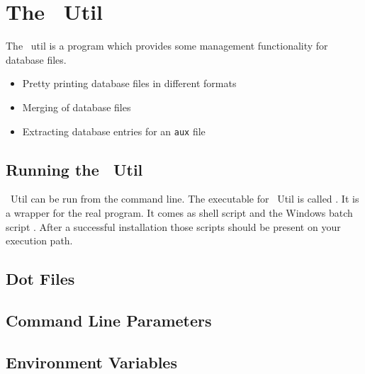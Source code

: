 

\section{The \ExBib\ Util}

The \ExBib\ util is a program which provides some management
functionality for database files. 

\begin{itemize}
\item Pretty printing database files in different formats
\item Merging of database files
\item Extracting database entries for an \texttt{aux} file
\end{itemize}


\subsection{Running the \ExBib\ Util}

\ExBib\ Util can be run from the command line.  The executable for
\ExBib\ Util is called . It is a wrapper for the real
program. It comes as shell script  and the Windows
batch script . After a successful installation
those scripts should be present on your execution path.


\subsection{Dot Files}%

\INCOMPLETE


\subsection{Command Line Parameters}


\INCOMPLETE


\subsection{Environment Variables}


\INCOMPLETE



\endinput
%
